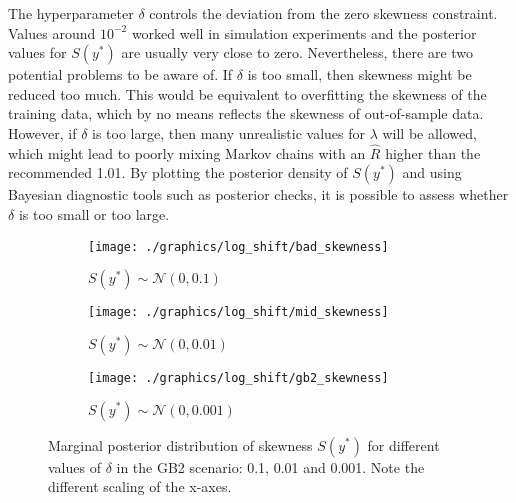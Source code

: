 The hyperparameter $\delta$ controls the deviation from the zero skewness constraint.
Values around $10^{-2}$ worked well in simulation experiments and the posterior values for $S(y^*)$ are usually very close to zero.
Nevertheless, there are two potential problems to be aware of.
If $\delta$ is too small, then skewness might be reduced too much.
This would be equivalent to overfitting the skewness of the training data, which by no means reflects the skewness of out-of-sample data.
However, if $\delta$ is too large, then many unrealistic values for $\lambda$ will be allowed, which might lead to poorly mixing Markov chains with an $\hat R$ higher than the recommended 1.01.
By plotting the posterior density of $S(y^*)$ and using Bayesian diagnostic tools such as posterior checks, it is possible to assess whether $\delta$ is too small or too large.


\begin{figure}[t]
    \centering
    \begin{subfigure}{0.32\linewidth}
        \texttt{[image: ./graphics/log\_shift/bad\_skewness]}
        \caption{$S(y^*) \sim \mathcal N (0, 0.1)$}
    \end{subfigure}
    \begin{subfigure}{0.32\linewidth}
        \texttt{[image: ./graphics/log\_shift/mid\_skewness]}
        \caption{$S(y^*) \sim \mathcal N (0, 0.01)$}
    \end{subfigure}
    \begin{subfigure}{0.32\linewidth}
        \texttt{[image: ./graphics/log\_shift/gb2\_skewness]}
        \caption{$S(y^*) \sim \mathcal N (0, 0.001)$}
    \end{subfigure}

    \caption[Marginal posterior distribution of skewness for different values of $\delta$.]{Marginal posterior distribution of skewness $S(y^*)$ for different values of $\delta$ in the GB2 scenario: 0.1, 0.01 and 0.001. Note the different scaling of the x-axes.}
    \label{fig:bad_skewness}
\end{figure}

